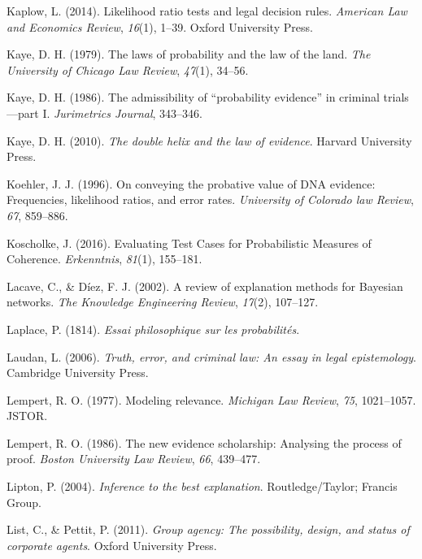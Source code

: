 \documentclass[11pt,dvipsnames,enabledeprecatedfontcommands]{scrartcl}
\begin{document}
\hypertarget{ref-kaplow2014likelihood}{}
Kaplow, L. (2014). Likelihood ratio tests and legal decision rules.
\emph{American Law and Economics Review}, \emph{16}(1), 1--39. Oxford
University Press.

\hypertarget{ref-kaye79}{}
Kaye, D. H. (1979). The laws of probability and the law of the land.
\emph{The University of Chicago Law Review}, \emph{47}(1), 34--56.

\hypertarget{ref-kaye1986admissibility}{}
Kaye, D. H. (1986). The admissibility of ``probability evidence'' in
criminal trials---part I. \emph{Jurimetrics Journal}, 343--346.

\hypertarget{ref-Kaye2010The-Double-Heli}{}
Kaye, D. H. (2010). \emph{The double helix and the law of evidence}.
Harvard University Press.

\hypertarget{ref-Koehler1996On-Conveying-th}{}
Koehler, J. J. (1996). On conveying the probative value of DNA evidence:
Frequencies, likelihood ratios, and error rates. \emph{University of
Colorado law Review}, \emph{67}, 859--886.

\hypertarget{ref-koscholke2016evaluating}{}
Koscholke, J. (2016). Evaluating Test Cases for Probabilistic Measures
of Coherence. \emph{Erkenntnis}, \emph{81}(1), 155--181.

\hypertarget{ref-lacave2002ReviewExplanationMethodsa}{}
Lacave, C., \& Díez, F. J. (2002). A review of explanation methods for
Bayesian networks. \emph{The Knowledge Engineering Review},
\emph{17}(2), 107--127.

\hypertarget{ref-Laplace1814}{}
Laplace, P. (1814). \emph{Essai philosophique sur les probabilités}.

\hypertarget{ref-laudan2006truth}{}
Laudan, L. (2006). \emph{Truth, error, and criminal law: An essay in
legal epistemology}. Cambridge University Press.

\hypertarget{ref-lempert1977modeling}{}
Lempert, R. O. (1977). Modeling relevance. \emph{Michigan Law Review},
\emph{75}, 1021--1057. JSTOR.

\hypertarget{ref-Lempert1986}{}
Lempert, R. O. (1986). The new evidence scholarship: Analysing the
process of proof. \emph{Boston University Law Review}, \emph{66},
439--477.

\hypertarget{ref-Lipton2004-LIPITT}{}
Lipton, P. (2004). \emph{Inference to the best explanation}.
Routledge/Taylor; Francis Group.

\hypertarget{ref-List2011Group}{}
List, C., \& Pettit, P. (2011). \emph{Group agency: The possibility,
design, and status of corporate agents}. Oxford University Press.
\end{document}
